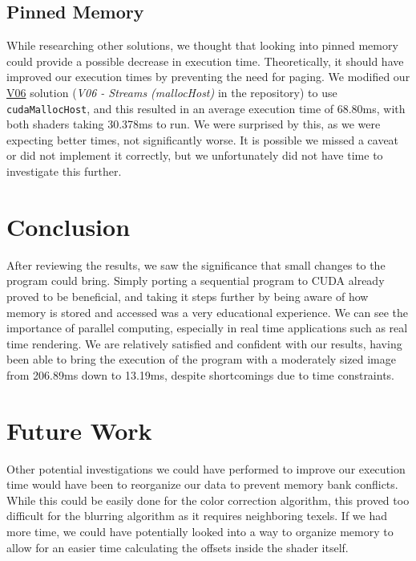 \documentclass[10pt,journal,compsoc]{IEEEtran}
\def\code#1{\texttt{#1}}
\begin{document}
\subsection{Pinned Memory}

\noindent While researching other solutions, we thought that looking into pinned memory could provide a possible decrease in execution time. Theoretically, it should have improved our execution times by preventing the need for paging\cite{pinnedmemory}. We modified our \hyperref[sec:V06]{V06} solution (\textit{V06 - Streams (mallocHost)} in the repository) to use \code{cudaMallocHost}, and this resulted in an average execution time of 68.80ms, with both shaders taking 30.378ms to run. We were surprised by this, as we were expecting better times, not significantly worse. It is possible we missed a caveat or did not implement it correctly, but we unfortunately did not have time to investigate this further. \\


\section{Conclusion}

\noindent After reviewing the results, we saw the significance that small changes to the program could bring. Simply porting a sequential program to CUDA already proved to be beneficial, and taking it steps further by being aware of how memory is stored and accessed was a very educational experience. We can see the importance of parallel computing, especially in real time applications such as real time rendering. We are relatively satisfied and confident with our results, having been able to bring the execution of the program with a moderately sized image from 206.89ms down to 13.19ms, despite shortcomings due to time constraints. \\ 


\section{Future Work}

\noindent Other potential investigations we could have performed to improve our execution time would have been to reorganize our data to prevent memory bank conflicts. While this could be easily done for the color correction algorithm, this proved too difficult for the blurring algorithm as it requires neighboring texels. If we had more time, we could have potentially looked into a way to organize memory to allow for an easier time calculating the offsets inside the shader itself. \\
\end{document}

